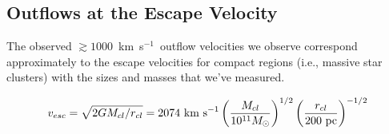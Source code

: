 \documentclass[apj]{emulateapj}
\newcommand{\kms}{km~s$^{-1}$}
\begin{document}
\subsection{Outflows at the Escape Velocity}

The observed $\gtrsim1000$~\kms\ outflow velocities we observe correspond
approximately to the escape velocities for compact regions (i.e.,
massive star clusters) with the sizes and masses that we've measured.

\begin{equation}
v_{esc} = \sqrt{2GM_{cl}/r_{cl}} = 2074~\textnormal{km~s}^{-1} \\%
\left({M_{cl}\over10^{11} M_{\odot}}\right)^{1/2} 
\left({r_{cl}\over200~\textnormal{pc}}\right)^{-1/2}
\label{eq:vesc}
\end{equation}


% 
\end{document}
